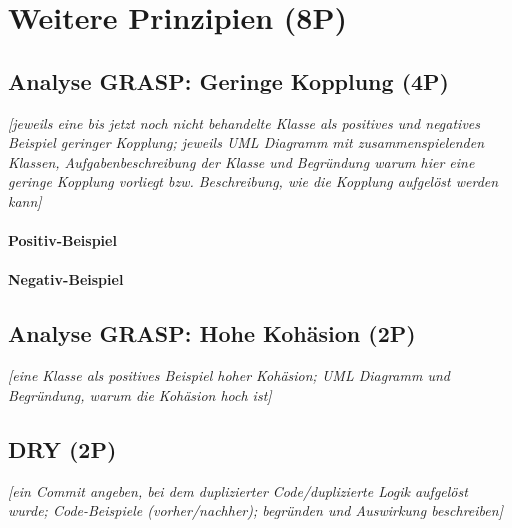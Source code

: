 
\titlespacing*{\chapter}{0pt}{-30mm}{10pt}
  
\chapter{Weitere Prinzipien (8P)}
\pagestyle{scrheadings}
\clearscrheadfoot
{}
\setcounter{page}{4}
\ofoot[\pagemark]{\pagemark}
\onehalfspacing

\section{Analyse GRASP: Geringe Kopplung (4P)}
\emph{[jeweils eine bis jetzt noch nicht behandelte Klasse als positives und negatives Beispiel geringer
Kopplung; jeweils UML Diagramm mit zusammenspielenden Klassen, Aufgabenbeschreibung der
Klasse und Begründung warum hier eine geringe Kopplung vorliegt bzw. Beschreibung, wie die
Kopplung aufgelöst werden kann]}

\subsubsection{Positiv-Beispiel}
\subsubsection{Negativ-Beispiel}

\section{Analyse GRASP: Hohe Kohäsion (2P)}
\emph{[eine Klasse als positives Beispiel hoher Kohäsion; UML Diagramm und Begründung, warum die
Kohäsion hoch ist]}

\section{DRY (2P)}
\emph{[ein Commit angeben, bei dem duplizierter Code/duplizierte Logik aufgelöst wurde; Code-Beispiele
(vorher/nachher); begründen und Auswirkung beschreiben]}